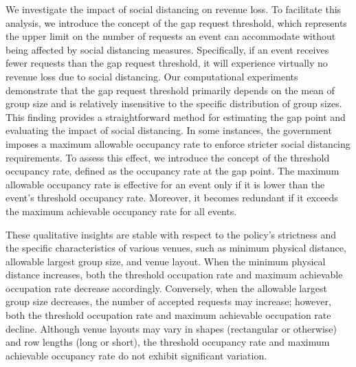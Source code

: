 
We investigate the impact of social distancing on revenue loss. To facilitate this analysis, we introduce the concept of the gap request threshold, which represents the upper limit on the number of requests an event can accommodate without being affected by social distancing measures. Specifically, if an event receives fewer requests than the gap request threshold, it will experience virtually no revenue loss due to social distancing. Our computational experiments demonstrate that the gap request threshold primarily depends on the mean of group size and is relatively insensitive to the specific distribution of group sizes. This finding provides a straightforward method for estimating the gap point and evaluating the impact of social distancing.
In some instances, the government imposes a maximum allowable occupancy rate to enforce stricter social distancing requirements. To assess this effect, we introduce the concept of the threshold occupancy rate, defined as the occupancy rate at the gap point. The maximum allowable occupancy rate is effective for an event only if it is lower than the event's threshold occupancy rate. Moreover, it becomes redundant if it exceeds the maximum achievable occupancy rate for all events.







These qualitative insights are stable with respect to the policy's strictness and the specific characteristics of various venues, such as minimum physical distance, allowable largest group size, and venue layout. When the minimum physical distance increases, both the threshold occupation rate and maximum achievable occupation rate decrease accordingly. Conversely, when the allowable largest group size decreases, the number of accepted requests may increase; however, both the threshold occupation rate and maximum achievable occupation rate decline. Although venue layouts may vary in shapes (rectangular or otherwise) and row lengths (long or short), the threshold occupancy rate and maximum achievable occupancy rate do not exhibit significant variation.


